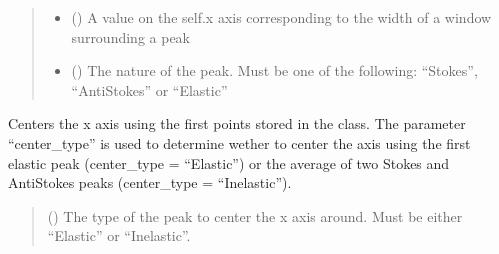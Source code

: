 \documentclass[letterpaper,10pt,english]{sphinxmanual}
\begin{document}
\begin{fulllineitems}
\begin{fulllineitems}
\begin{quote}
\begin{description}
\begin{itemize}
\item {} 
\sphinxAtStartPar
{} () \textendash{} A value on the self.x axis corresponding to the width of a window surrounding a peak

\item {} 
\sphinxAtStartPar
{} () \textendash{} The nature of the peak. Must be one of the following: “Stokes”, “Anti\sphinxhyphen{}Stokes” or “Elastic”

\end{itemize}

\end{description}\end{quote}

\end{fulllineitems}


\begin{fulllineitems}
\label{\detokenize{source/HDF5_BLS:HDF5_BLS.analyze.Analyze_VIPA.center_x_axis}}
\pysigstartsignatures
\pysiglinewithargsret
{}
{}
{}
\pysigstopsignatures
\sphinxAtStartPar
Centers the x axis using the first points stored in the class. The parameter “center\_type” is used to determine wether to center the axis using the first elastic peak (center\_type = “Elastic”) or the average of two Stokes and Anti\sphinxhyphen{}Stokes peaks (center\_type = “Inelastic”).
\begin{quote}\begin{description}
\sphinxAtStartPar
{} () \textendash{} The type of the peak to center the x axis around. Must be either “Elastic” or “Inelastic”.

\end{description}\end{quote}

\end{fulllineitems}



\end{fulllineitems}
\end{document}

